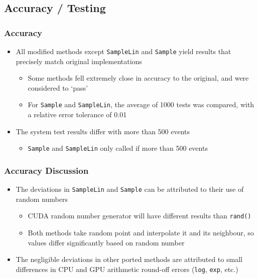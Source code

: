 \documentclass{beamer}
\begin{document}
\subsection{Accuracy / Testing}
\begin{frame}
\frametitle{Accuracy}
\begin{itemize}
\item All modified methods except \texttt{SampleLin} and \texttt{Sample}
yield results that precisely match original implementations
\begin{itemize}
\item Some methods fell extremely close in accuracy to 
the original, and were considered to `pass'
\item For \texttt{Sample} and \texttt{SampleLin}, the average of 1000 tests was compared, with a relative error tolerance of 0.01
\end{itemize}

\item The system test results differ with more than 500 events
\begin{itemize}
\item \texttt{Sample} and \texttt{SampleLin} only called if more than 500 events
\end{itemize}
\end{itemize}
\end{frame}

\begin{frame}
\frametitle{Accuracy Discussion}
\begin{itemize}
\item The deviations in \texttt{SampleLin} and \texttt{Sample} can be 
attributed to their use of random numbers
\begin{itemize}
\item CUDA random number generator will have different results than \texttt{rand()}
\item Both methods take random point and interpolate it and its neighbour, so values differ significantly based on random number
\end{itemize}
\item The negligible deviations in other ported methods 
are attributed to small differences in CPU and GPU 
arithmetic round-off errors (\texttt{log}, \texttt{exp}, etc.)
\end{itemize}
\end{frame}
\end{document}
